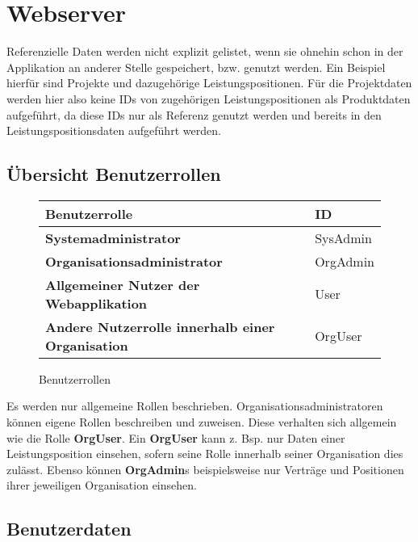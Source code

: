 \section{Webserver}

Referenzielle Daten werden nicht explizit gelistet, wenn sie ohnehin schon in der Applikation an anderer Stelle gespeichert, bzw. genutzt werden.
Ein Beispiel hierfür sind Projekte und dazugehörige Leistungspositionen. Für die Projektdaten werden hier also keine IDs von zugehörigen Leistungspositionen
als Produktdaten aufgeführt, da diese IDs nur als Referenz genutzt werden und bereits in den Leistungspositionsdaten aufgeführt werden.

\subsection{Übersicht Benutzerrollen}

\begin{figure}[h]
	\centering
	\begin{tabularx}{\textwidth}{| X | X |}
        \hline
		\textbf{Benutzerrolle} & \textbf{ID} \\ \hline \hline
		\textbf{Systemadministrator} & SysAdmin \\ \hline
		\textbf{Organisationsadministrator} & OrgAdmin \\ \hline
        \textbf{Allgemeiner Nutzer der Webapplikation} & User \\ \hline
		\textbf{Andere Nutzerrolle innerhalb einer Organisation} & OrgUser \\ \hline
	\end{tabularx}
	\caption{Benutzerrollen}
	\label{fig:Benutzerrollen}
\end{figure}

\begin{flushleft}
Es werden nur allgemeine Rollen beschrieben. Organisationsadministratoren können eigene Rollen beschreiben und zuweisen. Diese verhalten sich allgemein wie die Rolle \textbf{OrgUser}.
Ein \textbf{OrgUser} kann z. Bsp. nur Daten einer Leistungsposition einsehen, sofern seine Rolle innerhalb seiner Organisation dies zulässt. Ebenso können \textbf{OrgAdmin}s beispielsweise nur Verträge und
Positionen ihrer jeweiligen Organisation einsehen.
\end{flushleft}

\subsection{Benutzerdaten}

